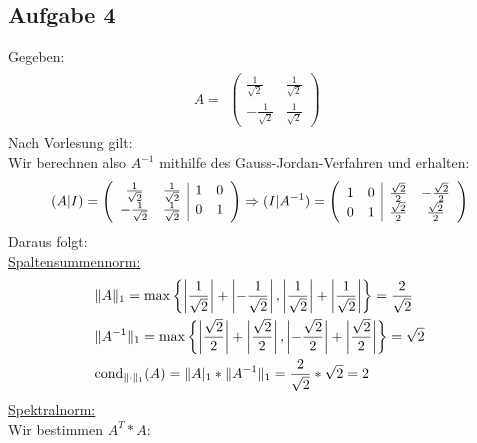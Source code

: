 \newpage
\subsection*{Aufgabe 4}
Gegeben:
\begin{align*} \label{eq8}
A=
\begin{split}
\begin{pmatrix}
\frac{1}{\sqrt2} & \frac{1}{\sqrt2} \\
-\frac{1}{\sqrt2} &\frac{1}{\sqrt2}
\end{pmatrix}
\end{split}
\end{align*}
Nach Vorlesung gilt: \\

Wir berechnen also $A^{-1}$ mithilfe des Gauss-Jordan-Verfahren und erhalten:
\begin{align*}
(A|I)=
\begin{split}
\begin{array}({cc|cc})
\frac{1}{\sqrt2} & \frac{1}{\sqrt2} & 1 & 0 \\
-\frac{1}{\sqrt2} &\frac{1}{\sqrt2} & 0 & 1
\end{array}
\Rightarrow(I|A^{-1})=
\begin{array}({cc|cc})
 1 & 0 & \frac{\sqrt2}{2} & -\frac{\sqrt2}{2} \\
 0 & 1 & \frac{\sqrt2}{2} & \frac{\sqrt2}{2}
\end{array}
\end{split}
\end{align*}
Daraus folgt:\\
\underline{Spaltensummennorm:}
\begin{align*}
\begin{split}
&\|A\|_1=\mathrm{max}\left\lbrace \left|\frac{1}{\sqrt2}\right|+\left|-\frac{1}{\sqrt2}\right|, \left|\frac{1}{\sqrt2}\right|+\left|\frac{1}{\sqrt2}\right|\right\rbrace=\frac{2}{\sqrt2}\\
&\|A^{-1}\|_1=\mathrm{max}\left\lbrace\left|\frac{\sqrt2}{2}\right|+\left|\frac{\sqrt2}{2}\right|, \left|-\frac{\sqrt2}{2}\right|+\left|\frac{\sqrt2}{2}\right|\right\rbrace={\sqrt2}\\
& \mathrm{cond}_{\| \cdot \|_1}(A)=\|A|_1*\|A^{-1}\|_1=\frac{2}{\sqrt2} * {\sqrt2} = 2\\
\end{split}
\end{align*}
\underline{Spektralnorm:}\\
Wir bestimmen $A^T*A$:\\
